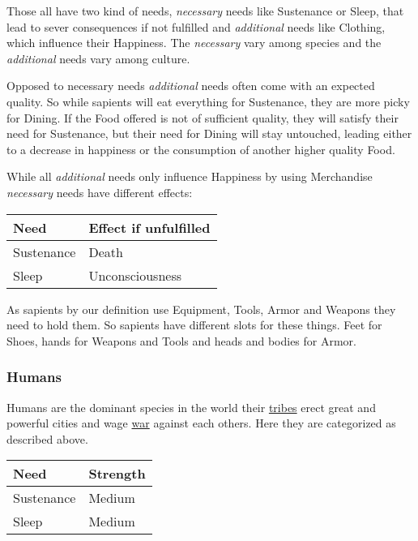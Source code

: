 Those all have two kind of needs, \emph{necessary} needs like \gls{Sustenance}
or \gls{Sleep}, that lead to sever consequences if not fulfilled and
\emph{additional} needs like \gls{Clothing}, which influence their Happiness.
The \emph{necessary} vary among species and the \emph{additional} needs vary
among culture.

Opposed to necessary needs \emph{additional} needs often come with an expected
quality. So while sapients will eat everything for \gls{Sustenance}, they are
more picky for \gls{Dining}. If the \gls{Food} offered is not of sufficient
quality, they will satisfy their need for \gls{Sustenance}, but their need for
\gls{Dining} will stay untouched, leading either to a decrease in happiness or
the consumption of another higher quality \gls{Food}.

While all \emph{additional} needs only influence Happiness by using
\gls{Merchandise} \emph{necessary} needs have different effects:

\begin{longtable}{ll}
	\toprule
	Need             & Effect if unfulfilled \\
	\midrule
	\Gls{Sustenance} & Death                 \\
	\Gls{Sleep}      & Unconsciousness       \\
	\bottomrule
\end{longtable}

As sapients by our definition use \gls{Equipment}, \glspl{Tool}, \gls{Armor}
and \glspl{Weapon} they need to hold them. So sapients have different slots for
these things. Feet for \glspl{Shoe}, hands for \glspl{Weapon} and \glspl{Tool}
and heads and bodies for \gls{Armor}.

\subsubsection{Humans}\label{ch:World:Inhabitants:Sapients:Humans}

Humans are the dominant species in the world their \hyperref[ch:tribes]{tribes}
erect great and powerful cities and wage \hyperref[ch:Conflict]{war} against
each others. Here they are categorized as described above.

\begin{longtable}{ll}
	\toprule
	Need             & Strength \\
	\midrule
	\Gls{Sustenance} & Medium   \\
	\Gls{Sleep}      & Medium   \\
	\bottomrule
\end{longtable}

